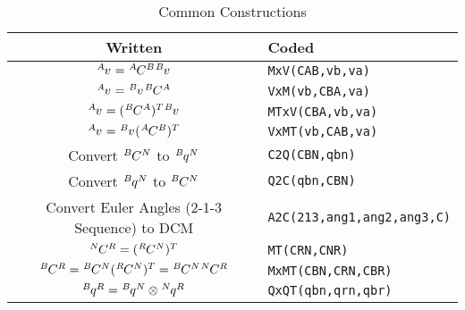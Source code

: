 \documentclass[12pt]{article}
\begin{document}
\begin{table}[h]
\caption{Common Constructions}
\begin{center}
\begin{tabular}{|c|l|}
\hline
Written & Coded \\ \hline
$\tensor[^A]{v}{}=\tensor[^A]{C}{^B}\tensor[^B]{v}{}$ & {\tt MxV(CAB,vb,va)} \\ \hline
$\tensor[^A]{v}{}=\tensor[^B]{v}{}\tensor[^B]{C}{^A}$ & {\tt VxM(vb,CBA,va)} \\ \hline
$\tensor[^A]{v}{}=(\tensor[^B]{C}{^A})^T\tensor[^B]{v}{}$ & {\tt MTxV(CBA,vb,va)} \\ \hline
$\tensor[^A]{v}{}=\tensor[^B]{v}{}(\tensor[^A]{C}{^B})^T$ & {\tt VxMT(vb,CAB,va)} \\ \hline
Convert $\tensor[^B]{C}{^N}$ to $\tensor[^B]{q}{^N}$ & {\tt C2Q(CBN,qbn)} \\ \hline
Convert $\tensor[^B]{q}{^N}$ to $\tensor[^B]{C}{^N}$ & {\tt Q2C(qbn,CBN)} \\ \hline
Convert Euler Angles (2-1-3 Sequence) to DCM & {\tt A2C(213,ang1,ang2,ang3,C)} \\ \hline
$\tensor[^N]{C}{^R} = (\tensor[^R]{C}{^N})^T$ & {\tt MT(CRN,CNR)} \\ \hline
$\tensor[^B]{C}{^R} = \tensor[^B]{C}{^N}(\tensor[^R]{C}{^N})^T = \tensor[^B]{C}{^N}\tensor[^N]{C}{^R}$ & {\tt MxMT(CBN,CRN,CBR)} \\ \hline
$\tensor[^B]{q}{^R} = \tensor[^B]{q}{^N}\otimes\tensor[^N]{q}{^R}$ & {\tt QxQT(qbn,qrn,qbr)} \\ \hline
\end{tabular}  
\end{center}
\end{table}
\end{document}
